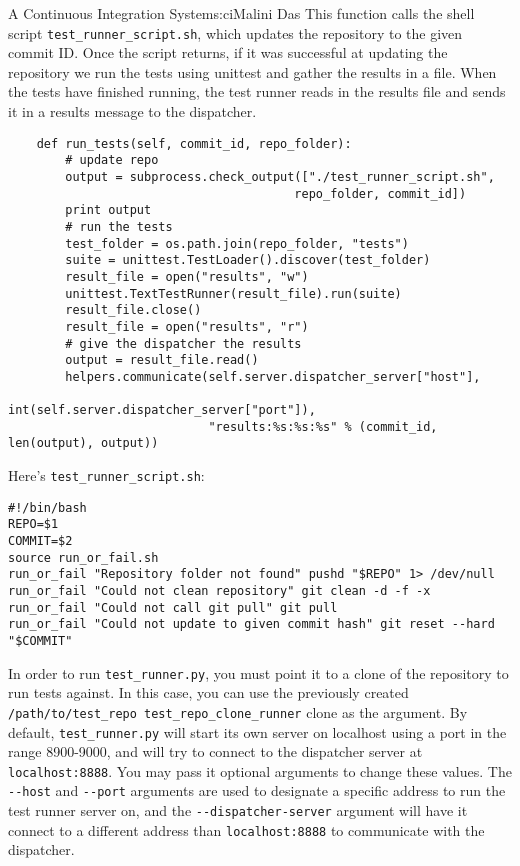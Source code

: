 \begin{aosachapter}{A Continuous Integration System}{s:ci}{Malini Das}
This function calls the shell script \texttt{test\_runner\_script.sh},
which updates the repository to the given commit ID. Once the script
returns, if it was successful at updating the repository we run the
tests using unittest and gather the results in a file. When the tests
have finished running, the test runner reads in the results file and
sends it in a results message to the dispatcher.

\begin{verbatim}
    def run_tests(self, commit_id, repo_folder):
        # update repo
        output = subprocess.check_output(["./test_runner_script.sh",
                                        repo_folder, commit_id])
        print output
        # run the tests
        test_folder = os.path.join(repo_folder, "tests")
        suite = unittest.TestLoader().discover(test_folder)
        result_file = open("results", "w")
        unittest.TextTestRunner(result_file).run(suite)
        result_file.close()
        result_file = open("results", "r")
        # give the dispatcher the results
        output = result_file.read()
        helpers.communicate(self.server.dispatcher_server["host"],
                            int(self.server.dispatcher_server["port"]),
                            "results:%s:%s:%s" % (commit_id, len(output), output))
\end{verbatim}

Here's \texttt{test\_runner\_script.sh}:

\begin{verbatim}
#!/bin/bash
REPO=$1
COMMIT=$2
source run_or_fail.sh
run_or_fail "Repository folder not found" pushd "$REPO" 1> /dev/null
run_or_fail "Could not clean repository" git clean -d -f -x
run_or_fail "Could not call git pull" git pull
run_or_fail "Could not update to given commit hash" git reset --hard "$COMMIT"
\end{verbatim}

In order to run \texttt{test\_runner.py}, you must point it to a clone
of the repository to run tests against. In this case, you can use the
previously created
\texttt{/path/to/test\_repo test\_repo\_clone\_runner} clone as the
argument. By default, \texttt{test\_runner.py} will start its own server
on localhost using a port in the range 8900-9000, and will try to
connect to the dispatcher server at \texttt{localhost:8888}. You may
pass it optional arguments to change these values. The \texttt{-{}-host}
and \texttt{-{}-port} arguments are used to designate a specific address
to run the test runner server on, and the \texttt{-{}-dispatcher-server}
argument will have it connect to a different address than
\texttt{localhost:8888} to communicate with the dispatcher.


\end{aosachapter}
